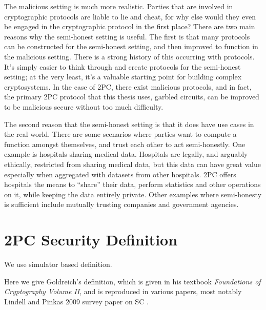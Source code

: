 The malicious setting is much more realistic. 
Parties that are involved in cryptographic protocols are liable to lie and cheat, for why else would they even be engaged in the cryptographic protocol in the first place?
There are two main reasons why the semi-honest setting is useful.
The first is that many protocols can be constructed for the semi-honest setting, and then improved to function in the malicious setting.
There is a strong history of this occurring with protocols.
It's simply easier to think through and create protocols for the semi-honest setting; at the very least, it's a valuable starting point for building complex cryptosystems.
In the case of 2PC, there exist malicious protocols, and in fact, the primary 2PC protocol that this thesis uses, garbled circuits, can be improved to be malicious secure without too much difficulty. 

The second reason that the semi-honest setting is that it does have use cases in the real world.
There are some scenarios where parties want to compute a function amongst themselves, and trust each other to act semi-honestly.
One example is hospitals sharing medical data.
Hospitals are legally, and arguably ethically, restricted from sharing medical data, but this data can have great value especially when aggregated with datasets from other hospitals.
2PC offers hospitals the means to ``share'' their data, perform statistics and other operations on it, while keeping the data entirely private. 
Other examples where semi-honesty is sufficient include mutually trusting companies and government agencies.

\section{2PC Security Definition}

We use simulator based definition.


Here we give Goldreich's definition, which is given in his textbook \textit{Foundations of Cryptography Volume II}, and is reproduced in various papers, most notably Lindell and Pinkas 2009 survey paper on SC \cite{goldreich, lindell2009secure}.

